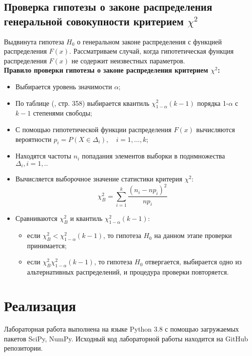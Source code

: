 \documentclass[12pt,a4paper]{article}
\begin{document}
		\subsection{Проверка гипотезы о законе распределения генеральной совокупности критерием $\chi^2$}
			Выдвинута гипотеза $H_0$ о генеральном законе распределения с функцией
			распределения $F(x)$.
			Рассматриваем случай, когда гипотетическая функция распределения $F(x)$
			не содержит неизвестных параметров.\\
			\textbf{Правило проверки гипотезы о законе распределения критерием $\chi^2$:}
			\begin{itemize}
				\item Выбирается уровень значимости $\alpha$;
				\item По таблице (\cite{maksimov}, стр. 358) выбирается квантиль $\chi_{1-\alpha}^2(k-1)$ порядка 1-$\alpha$ с $k-1$ степенями свободы;
				\item С помощью гипотетической функции распределения $F(x)$ вычисляются вероятности $p_i = P(X \in \Delta_i), \quad i=1,...,k$;
				\item Находятся частоты $n_i$ попадания элементов выборки в поднмножества $\Delta_i, i=1,..$ 
				\item Вычисляется выборочное значение статистики критерия $\chi^2$:
				\begin{equation}
					\chi_B^2=\sum_{i=1}^{k}\frac{(n_i-np_i)^2}{np_i}
				\end{equation} 
				\item Сравниваются $\chi_B^2$ и квантиль $\chi_{1-\alpha}^2(k-1)$:
				\begin{itemize}
					\item если $\chi_B^2 < \chi_{1-\alpha}^2(k-1)$, то гипотеза $H_0$ на данном этапе проверки принимается;
					\item если $\chi_B^2  \chi_{1-\alpha}^2(k-1)$, то гипотеза $H_0$ отвергается, выбирается
					одно из альтернативных распределений, и процедура проверки повторяется.
				\end{itemize}
			\end{itemize}
		\newpage
		
		\section{Реализация}
		Лабораторная работа выполнена на языке Python 3.8 с помощью загружаемых пакетов SciPy, NumPy. Исходный код лабораторной работы находится на GitHub репозитории.
		\newpage
		
\end{document}

